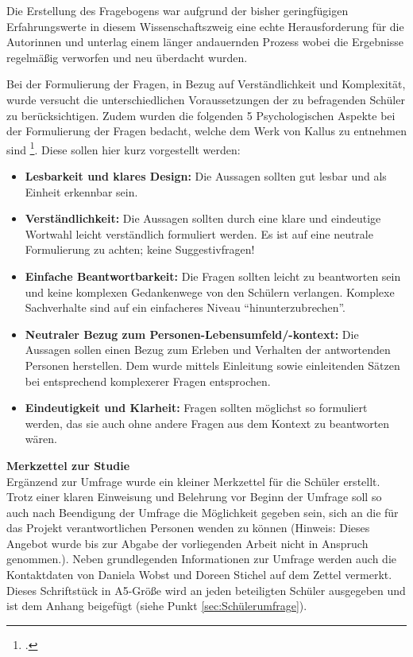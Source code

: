 Die Erstellung des Fragebogens war aufgrund der bisher geringfügigen Erfahrungswerte in diesem Wissenschaftszweig eine echte Herausforderung für die Autorinnen und unterlag einem länger andauernden Prozess wobei die Ergebnisse regelmäßig verworfen und neu überdacht wurden.
 
Bei der Formulierung der Fragen, in Bezug auf Verständlichkeit und Komplexität, wurde versucht die unterschiedlichen Voraussetzungen der zu befragenden Schüler zu berücksichtigen. Zudem wurden die folgenden 5 Psychologischen Aspekte bei der Formulierung der Fragen bedacht, welche dem Werk von Kallus zu entnehmen sind \footcite[vgl.][63-66]{Kallus2010}. Diese sollen hier kurz vorgestellt werden:

\begin{itemize}
	\item \textbf{Lesbarkeit und klares Design:} Die Aussagen sollten gut lesbar und als Einheit erkennbar sein. 
	\item \textbf{Verständlichkeit:} Die Aussagen sollten durch eine klare und eindeutige Wortwahl leicht verständlich formuliert werden. Es ist auf eine neutrale Formulierung zu achten; keine Suggestivfragen!
	\item \textbf{Einfache Beantwortbarkeit:} Die Fragen sollten leicht zu beantworten sein und keine komplexen Gedankenwege von den Schülern verlangen. Komplexe Sachverhalte sind auf ein einfacheres Niveau "`hinunterzubrechen"'.
	\item \textbf{Neutraler Bezug zum Personen-Lebensumfeld/-kontext:} Die Aussagen sollen einen Bezug zum Erleben und Verhalten der antwortenden Personen herstellen. Dem wurde mittels Einleitung sowie einleitenden Sätzen bei entsprechend komplexerer Fragen entsprochen.
	\item \textbf{Eindeutigkeit und Klarheit:} Fragen sollten möglichst so formuliert werden, das sie auch ohne andere Fragen aus dem Kontext zu beantworten wären.
\end{itemize}

\noindent
\textbf{Merkzettel zur Studie}\\

\noindent
Ergänzend zur Umfrage wurde ein kleiner Merkzettel für die Schüler erstellt. Trotz einer klaren Einweisung und Belehrung vor Beginn der Umfrage soll so auch nach Beendigung der Umfrage die Möglichkeit gegeben sein, sich an die für das Projekt verantwortlichen Personen wenden zu können (Hinweis: Dieses Angebot wurde bis zur Abgabe der vorliegenden Arbeit nicht in Anspruch genommen.). Neben grundlegenden Informationen zur Umfrage werden auch die Kontaktdaten von Daniela Wobst und Doreen Stichel auf dem Zettel vermerkt. Dieses Schriftstück in A5-Größe wird an jeden beteiligten Schüler ausgegeben und ist dem Anhang beigefügt (siehe Punkt \ref{sec:Schülerumfrage}). \\

